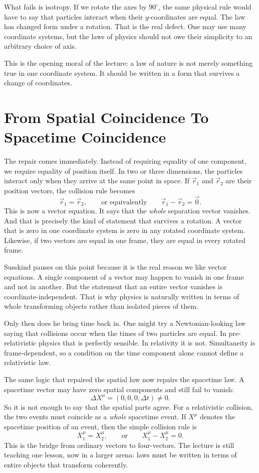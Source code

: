 What fails is isotropy. If we rotate the axes by \(90^\circ\), the same physical rule would have to say that particles interact when their \(y\)-coordinates are equal. The law has changed form under a rotation. That is the real defect. One may use many coordinate systems, but the laws of physics should not owe their simplicity to an arbitrary choice of axis.

This is the opening moral of the lecture: a law of nature is not merely something true in one coordinate system. It should be written in a form that survives a change of coordinates.

\section{From Spatial Coincidence To Spacetime Coincidence}

The repair comes immediately. Instead of requiring equality of one component, we require equality of position itself. In two or three dimensions, the particles interact only when they arrive at the same point in space. If \(\vec r_1\) and \(\vec r_2\) are their position vectors, the collision rule becomes
\begin{equation}
\vec r_1=\vec r_2,
\qquad\text{or equivalently}\qquad
\vec r_1-\vec r_2=\vec 0.
\end{equation}
This is now a vector equation. It says that the \emph{whole} separation vector vanishes. And that is precisely the kind of statement that survives a rotation. A vector that is zero in one coordinate system is zero in any rotated coordinate system. Likewise, if two vectors are equal in one frame, they are equal in every rotated frame.

Susskind pauses on this point because it is the real reason we like vector equations. A single component of a vector may happen to vanish in one frame and not in another. But the statement that an entire vector vanishes is coordinate-independent. That is why physics is naturally written in terms of whole transforming objects rather than isolated pieces of them.

Only then does he bring time back in. One might try a Newtonian-looking law saying that collisions occur when the times of two particles are equal. In pre-relativistic physics that is perfectly sensible. In relativity it is not. Simultaneity is frame-dependent, so a condition on the time component alone cannot define a relativistic law.

The same logic that repaired the spatial law now repairs the spacetime law. A spacetime vector may have zero spatial components and still fail to vanish:
\[
\Delta X^\mu=(0,0,0,\Delta t)\neq 0.
\]
So it is not enough to say that the spatial parts agree. For a relativistic collision, the two events must coincide as a \emph{whole} spacetime event. If \(X^\mu\) denotes the spacetime position of an event, then the simple collision rule is
\begin{equation}
X_1^\mu=X_2^\mu,
\qquad\text{or}\qquad
X_1^\mu-X_2^\mu=0.
\end{equation}
This is the bridge from ordinary vectors to four-vectors. The lecture is still teaching one lesson, now in a larger arena: laws must be written in terms of entire objects that transform coherently.

